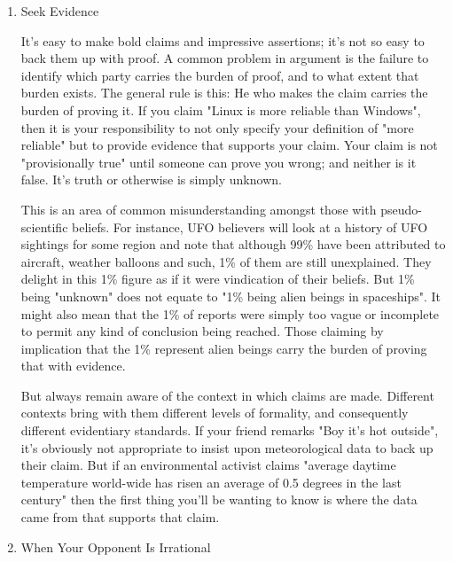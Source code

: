 \documentclass{article}
\begin{document}
\begin{enumerate}
\item Seek Evidence
\label{sec:orgheadline85}

It's easy to make bold claims and impressive assertions; it's not so
easy to back them up with proof. A common problem in argument is the
failure to identify which party carries the burden of proof, and to what
extent that burden exists. The general rule is this: He who makes the
claim carries the burden of proving it. If you claim "Linux is more
reliable than Windows", then it is your responsibility to not only
specify your definition of "more reliable" but to provide evidence that
supports your claim. Your claim is not "provisionally true" until
someone can prove you wrong; and neither is it false. It's truth or
otherwise is simply unknown.

This is an area of common misunderstanding amongst those with
pseudo-scientific beliefs. For instance, UFO believers will look at a
history of UFO sightings for some region and note that although 99\% have
been attributed to aircraft, weather balloons and such, 1\% of them are
still unexplained. They delight in this 1\% figure as if it were
vindication of their beliefs. But 1\% being "unknown" does not equate to
"1\% being alien beings in spaceships". It might also mean that the 1\% of
reports were simply too vague or incomplete to permit any kind of
conclusion being reached. Those claiming by implication that the 1\%
represent alien beings carry the burden of proving that with evidence.

But always remain aware of the context in which claims are made.
Different contexts bring with them different levels of formality, and
consequently different evidentiary standards. If your friend remarks
"Boy it's hot outside", it's obviously not appropriate to insist upon
meteorological data to back up their claim. But if an environmental
activist claims "average daytime temperature world-wide has risen an
average of 0.5 degrees in the last century" then the first thing you'll
be wanting to know is where the data came from that supports that claim.

\item When Your Opponent Is Irrational
\label{sec:orgheadline86}


\end{enumerate}
\end{document}
